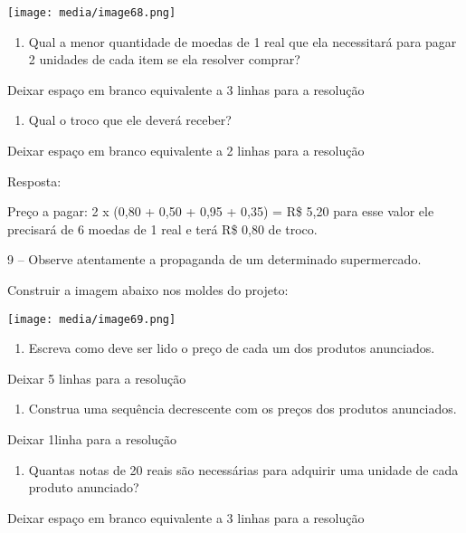 \texttt{[image: media/image68.png]}

\begin{enumerate}
\def\labelenumi{\alph{enumi})}
\item
  Qual a menor quantidade de moedas de 1 real que ela necessitará para
  pagar 2 unidades de cada item se ela resolver comprar?
\end{enumerate}

Deixar espaço em branco equivalente a 3 linhas para a resolução

\begin{enumerate}
\def\labelenumi{\alph{enumi})}
\item
  Qual o troco que ele deverá receber?
\end{enumerate}

Deixar espaço em branco equivalente a 2 linhas para a resolução

Resposta:

Preço a pagar: 2 x (0,80 + 0,50 + 0,95 + 0,35) = R\$ 5,20 para esse
valor ele precisará de 6 moedas de 1 real e terá R\$ 0,80 de troco.

9 -- Observe atentamente a propaganda de um determinado supermercado.

Construir a imagem abaixo nos moldes do projeto:

\texttt{[image: media/image69.png]}

\begin{enumerate}
\def\labelenumi{\alph{enumi})}
\item
  Escreva como deve ser lido o preço de cada um dos produtos anunciados.
\end{enumerate}

Deixar 5 linhas para a resolução

\begin{enumerate}
\def\labelenumi{\alph{enumi})}
\item
  Construa uma sequência decrescente com os preços dos produtos
  anunciados.
\end{enumerate}

Deixar 1linha para a resolução

\begin{enumerate}
\def\labelenumi{\alph{enumi})}
\item
  Quantas notas de 20 reais são necessárias para adquirir uma unidade de
  cada produto anunciado?
\end{enumerate}

Deixar espaço em branco equivalente a 3 linhas para a resolução

